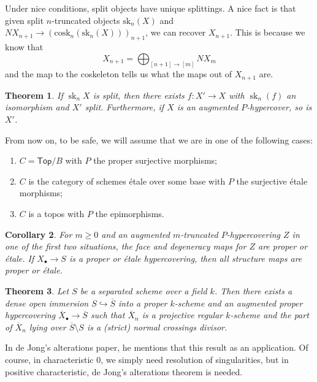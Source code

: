 \documentclass[leqno, openany]{memoir}
\newtheorem{thm}{Theorem}[section]
\newtheorem{cor}[thm]{Corollary}
\theoremstyle{definition}
\theoremstyle{remark}
\theoremstyle{plain}
\theoremstyle{definition}
\theoremstyle{remark}
\newcommand{\mr}[1]{\mathrm{#1}}
\newcommand{\ms}[1]{\mathsf{#1}}
\newcommand{\on}[1]{\operatorname{#1}}
\newcommand{\ol}[1]{\overline{#1}}
\begin{document}
Under nice conditions, split objects have unique splittings. A nice fact is that given split $n$-truncated objects $\mr{sk}_n(X)$ and $NX_{n+1} \to (\mr{cosk}_n(\mr{sk}_n(X)))_{n+1}$, we can recover $X_{n+1}$. This is because we know that
\[ X_{n+1} = \bigoplus_{[n+1] \to [m]} NX_m \]
and the map to the coskeleton tells us what the maps out of $X_{n+1}$ are.

\begin{thm}
    If $\on{sk}_n X$ is split, then there exists $f \colon X' \to X$ with $\on{sk}_n(f)$ an isomorphism and $X'$ split. Furthermore, if $X$ is an augmented $P$-hypercover, so is $X'$.
\end{thm}

From now on, to be safe, we will assume that we are in one of the following cases:
\begin{enumerate}
    \item $C = \ms{Top}/B$ with $P$ the proper surjective morphisms;
    \item $C$ is the category of schemes \'etale over some base with $P$ the surjective \'etale morphisms;
    \item $C$ is a topos with $P$ the epimorphisms.
\end{enumerate}

\begin{cor}
    For $m \geq 0$ and an augmented $m$-truncated $P$-hypercovering $Z$ in one of the first two situations, the face and degeneracy maps for $Z$ are proper or \'etale. If $X_{\bullet} \to S$ is a proper or \'etale hypercovering, then all structure maps are proper or \'etale.
\end{cor}

\begin{thm}
    Let $S$ be a separated scheme over a field $k$. Then there exists a dense open immersion $S \hookrightarrow \ol{S}$ into a proper $k$-scheme and an augmented proper hypercovering $\ol{X}_{\bullet} \to \ol{S}$ such that $\ol{X}_n$ is a projective regular $k$-scheme and the part of $\ol{X}_n$ lying over $\ol{S} \setminus S$ is a (strict) normal crossings divisor.
\end{thm}

In de Jong's alterations paper, he mentions that this result as an application. Of course, in characteristic $0$, we simply need resolution of singularities, but in positive characteristic, de Jong's alterations theorem is needed.
\end{document}
